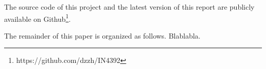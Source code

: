 \documentclass[conference]{IEEEtran}
\begin{document}
The source code of this project and the latest version of this report are publicly available on Github\footnote{https://github.com/dzzh/IN4392}.

The remainder of this paper is organized as follows. Blablabla.

%
%



%
%
\end{document}
